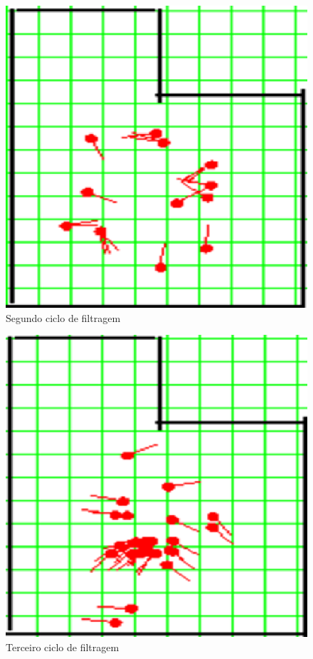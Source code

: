 \begin{figure}[H]
  \centering
  \includegraphics[scale=0.6]{figuras/cen1_ex4/3.eps}
  \caption[Segundo Ciclo de Filtragem]{Segundo ciclo de filtragem}
  \label{img:cen1_ex4_3}
\end{figure}

\begin{figure}[H]
  \centering
  \includegraphics[scale=0.6]{figuras/cen1_ex4/4.eps}
  \caption[Terceiro Ciclo de Filtragem]{Terceiro ciclo de filtragem}
  \label{img:cen1_ex4_4}
\end{figure}

